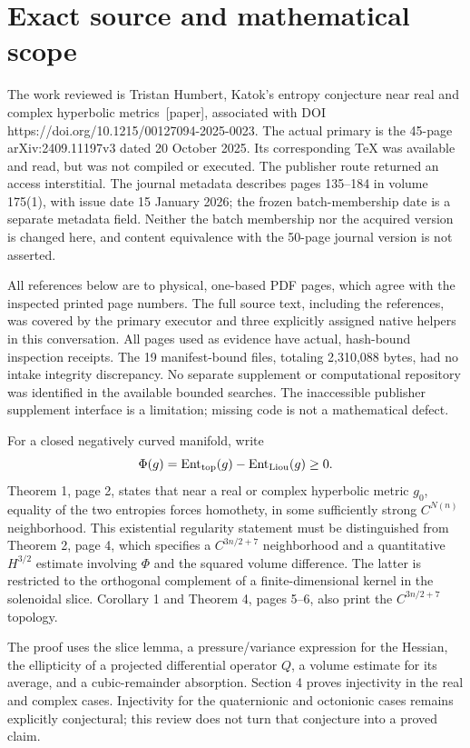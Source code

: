\documentclass[10pt]{article}
\begin{document}
\section*{Exact source and mathematical scope}
The work reviewed is Tristan Humbert, Katok’s entropy conjecture near real and complex hyperbolic metrics [paper], associated with DOI https://doi.org/10.1215/00127094-2025-0023. The actual primary is the 45-page arXiv:2409.11197v3 dated 20 October 2025. Its corresponding TeX was available and read, but was not compiled or executed. The publisher route returned an access interstitial. The journal metadata describes pages 135–184 in volume 175(1), with issue date 15 January 2026; the frozen batch-membership date is a separate metadata field. Neither the batch membership nor the acquired version is changed here, and content equivalence with the 50-page journal version is not asserted.\par
All references below are to physical, one-based PDF pages, which agree with the inspected printed page numbers. The full source text, including the references, was covered by the primary executor and three explicitly assigned native helpers in this conversation. All pages used as evidence have actual, hash-bound inspection receipts. The 19 manifest-bound files, totaling 2,310,088 bytes, had no intake integrity discrepancy. No separate supplement or computational repository was identified in the available bounded searches. The inaccessible publisher supplement interface is a limitation; missing code is not a mathematical defect.\par
For a closed negatively curved manifold, write \[\Phi(g)=\operatorname{Ent}_{\rm top}(g)
          -\operatorname{Ent}_{\rm Liou}(g)\ge0.\] Theorem 1, page 2, states that near a real or complex hyperbolic metric \(g_0\), equality of the two entropies forces homothety, in some sufficiently strong \(C^{N(n)}\) neighborhood. This existential regularity statement must be distinguished from Theorem 2, page 4, which specifies a \(C^{3n/2+7}\) neighborhood and a quantitative \(H^{3/2}\) estimate involving \(\Phi\) and the squared volume difference. The latter is restricted to the orthogonal complement of a finite-dimensional kernel in the solenoidal slice. Corollary 1 and Theorem 4, pages 5–6, also print the \(C^{3n/2+7}\) topology.\par
The proof uses the slice lemma, a pressure/variance expression for the Hessian, the ellipticity of a projected differential operator \(Q\), a volume estimate for its average, and a cubic-remainder absorption. Section 4 proves injectivity in the real and complex cases. Injectivity for the quaternionic and octonionic cases remains explicitly conjectural; this review does not turn that conjecture into a proved claim.\par
\end{document}
